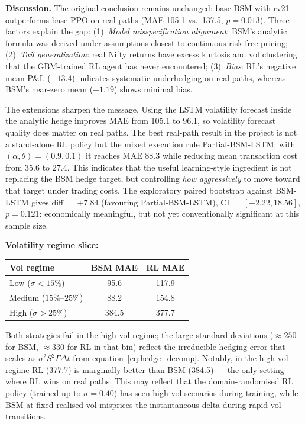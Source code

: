 \documentclass[12pt,a4paper]{article}
\begin{document}
\textbf{Discussion.}  The original conclusion remains unchanged: base BSM with
rv21 outperforms base PPO on real paths (MAE 105.1 vs.\ 137.5, $p=0.013$).
Three factors explain the gap:
(1)~\textit{Model misspecification alignment}: BSM's analytic formula was
derived under assumptions closest to continuous risk-free pricing;
(2)~\textit{Tail generalization}: real Nifty returns have excess kurtosis and
vol clustering that the GBM-trained RL agent has never encountered;
(3)~\textit{Bias}: RL's negative mean P\&L ($-13.4$) indicates systematic
underhedging on real paths, whereas BSM's near-zero mean ($+1.19$) shows
minimal bias.

The extensions sharpen the message.  Using the LSTM volatility forecast inside
the analytic hedge improves MAE from 105.1 to 96.1, so volatility forecast
quality does matter on real paths.  The best real-path result in the project is
not a stand-alone RL policy but the mixed execution rule
Partial-BSM-LSTM: with $(\alpha,\theta)=(0.9,0.1)$ it reaches MAE 88.3 while
reducing mean transaction cost from 35.6 to 27.4.  This indicates that the
useful learning-style ingredient is not replacing the BSM hedge target, but
controlling \emph{how aggressively} to move toward that target under trading
costs.  The exploratory paired bootstrap against BSM-LSTM gives diff
$= +7.84$ (favouring Partial-BSM-LSTM), CI $=[-2.22, 18.56]$, $p=0.121$:
economically meaningful, but not yet conventionally significant at this sample
size.

\textbf{Volatility regime slice:}
\begin{center}
\begin{tabular}{lcc}
  \toprule
  Vol regime & BSM MAE & RL MAE \\
  \midrule
  Low ($\sigma < 15\%$)    &  95.6 & 117.9 \\
  Medium ($15\%$--$25\%$)  &  88.2 & 154.8 \\
  High ($\sigma > 25\%$)   & 384.5 & 377.7 \\
  \bottomrule
\end{tabular}
\end{center}
Both strategies fail in the high-vol regime; the large standard deviations
($\approx 250$ for BSM, $\approx 330$ for RL in that bin) reflect the
irreducible hedging error that scales as $\sigma^2 S^2\Gamma\Delta t$ from
equation~\eqref{eq:hedge_decomp}.  Notably, in the high-vol regime RL (377.7)
is marginally better than BSM (384.5) --- the only setting where RL wins on
real paths.  This may reflect that the domain-randomised RL policy
(trained up to $\sigma=0.40$) has seen high-vol scenarios during training,
while BSM at fixed realised vol misprices the instantaneous delta during
rapid vol transitions.
\end{document}
